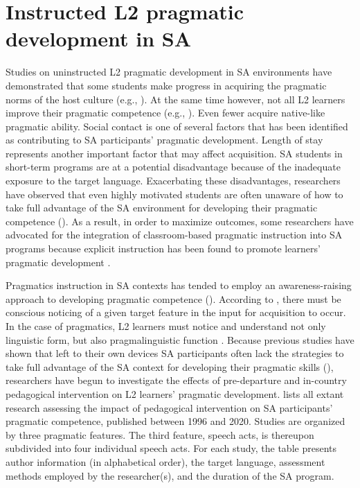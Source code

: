 \documentclass[output=paper]{langscibook}
\begin{document}
\section{Instructed L2 pragmatic development in SA}

\begin{sloppypar}
  Studies on uninstructed L2 pragmatic development in SA environments have demonstrated that some students make progress in acquiring the pragmatic norms of the host culture (e.g., \citealt{ShivelyCohen2008}). At the same time however, not all L2 learners improve their pragmatic competence (e.g., \citealt{Bataller2010,Hernández2018a,ShivelyCohen2008}). Even fewer acquire native-like pragmatic ability. Social contact is one of several factors that has been identified as contributing to SA participants’ pragmatic development. Length of stay represents another important factor that may affect acquisition. SA students in short-term programs are at a potential disadvantage because of the inadequate exposure to the target language. Exacerbating these disadvantages, researchers have observed that even highly motivated students are often unaware of how to take full advantage of the SA environment for developing their pragmatic competence (\citealt{CohenShively2007,HernándezBoero2018a,Shively2010}). As a result, in order to maximize outcomes, some researchers have advocated for the integration of classroom-based pragmatic instruction into SA programs because explicit instruction has been found to promote learners’ pragmatic development \citep{Martínez-FlorUsó-Juan2006}.
\end{sloppypar}

  Pragmatics instruction in SA contexts has tended to employ an awareness-raising approach to developing pragmatic competence (\citealt{HalenkoJones2017,HernándezBoero2018a,HernándezBoero2018b,HernándezBoero2019,Martínez-FlorUsó-Juan2006,Shively2010}). According to \citet{Schmidt2001}, there must be conscious noticing of a given target feature in the input for acquisition to occur. In the case of pragmatics, L2 learners must notice and understand not only linguistic form, but also pragmalinguistic function \citep{Morris2017}. Because previous studies have shown that left to their own devices SA participants often lack the strategies to take full advantage of the SA context for developing their pragmatic skills (\citealt{CohenShively2007,Hernández2016,Hernández2018a,PérezVidalShively2019,Shively2010,ShivelyCohen2008}), researchers have begun to investigate the effects of pre-departure and in-country pedagogical intervention on L2 learners’ pragmatic development.  lists all extant research assessing the impact of pedagogical intervention on SA participants’ pragmatic competence, published between 1996 and 2020. Studies are organized by three pragmatic features. The third feature, speech acts, is thereupon subdivided into four individual speech acts. For each study, the table presents author information (in alphabetical order), the target language, assessment methods employed by the researcher(s), and the duration of the SA program.
\end{document}
